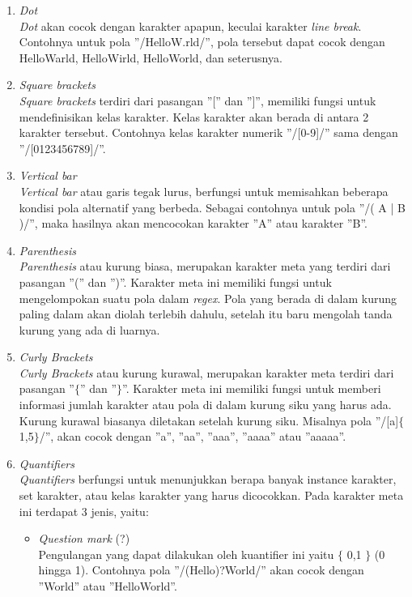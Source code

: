 \begin{enumerate}
	\item \textit{Dot} \\
	\textit{Dot} akan cocok dengan karakter apapun, keculai karakter \textit{line break}. Contohnya untuk pola ''/HelloW.rld/'', pola tersebut dapat cocok dengan HelloWarld, HelloWirld, HelloWorld, dan seterusnya.
	
	\item \textit{Square brackets} \\
	\textit{Square brackets} terdiri dari pasangan ''['' dan '']'', memiliki fungsi untuk mendefinisikan kelas karakter. Kelas karakter akan berada di antara 2 karakter tersebut. Contohnya kelas karakter numerik ''/[0-9]/'' sama dengan ''/[0123456789]/''.
	
	\item \textit{Vertical bar} \\
	\textit{Vertical bar} atau garis tegak lurus, berfungsi untuk memisahkan beberapa kondisi pola alternatif yang berbeda. Sebagai contohnya untuk pola ''/( A | B )/'', maka hasilnya akan mencocokan karakter ''A'' atau karakter ''B''.
	
	\item \textit{Parenthesis} \\
	\textit{Parenthesis} atau kurung biasa, merupakan karakter meta yang terdiri dari pasangan ''('' dan '')''. Karakter meta ini memiliki fungsi untuk mengelompokan suatu pola dalam \textit{regex}. Pola yang berada di dalam kurung paling dalam akan diolah terlebih dahulu, setelah itu baru mengolah tanda kurung yang ada di luarnya.
	
	\item \textit{Curly Brackets} \\
	\textit{Curly Brackets} atau kurung kurawal, merupakan karakter meta terdiri dari pasangan ''$\lbrace$'' dan ''$\rbrace$''. Karakter meta ini memiliki fungsi untuk memberi informasi jumlah karakter atau pola di dalam kurung siku yang harus ada. Kurung kurawal biasanya diletakan setelah kurung siku. Misalnya pola ''/[a]$\lbrace$1,5$\rbrace$/'', akan cocok dengan ''a'', ''aa'', ''aaa'', ''aaaa'' atau ''aaaaa''.	
	
	\item \textit{Quantifiers} \\
	\textit{Quantifiers} berfungsi untuk menunjukkan berapa banyak instance karakter, set karakter, atau kelas karakter yang harus dicocokkan. Pada karakter meta ini terdapat 3 jenis, yaitu:
	\begin{itemize}
		\item \textit{Question mark} (?)\\
		Pengulangan yang dapat dilakukan oleh kuantifier ini yaitu $\lbrace$ 0,1 $\rbrace$ (0 hingga 1). Contohnya pola ''/(Hello)?World/'' akan cocok dengan ''World'' atau ''HelloWorld''.
		

\end{itemize}
\end{enumerate}
